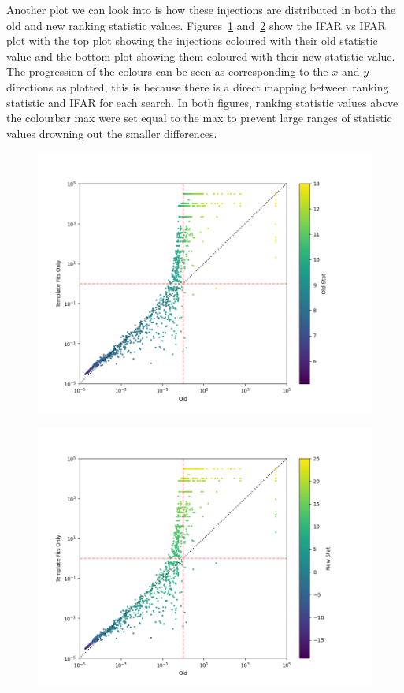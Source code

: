 %
Another plot we can look into is how these injections are distributed in both the old and new ranking statistic values. Figures~\ref{fig:pycbclive-ifar-ifar-old-stat} and~\ref{fig:pycbclive-ifar-ifar-new-stat} show the IFAR vs IFAR plot with the top plot showing the injections coloured with their old statistic value and the bottom plot showing them coloured with their new statistic value. The progression of the colours can be seen as corresponding to the $x$ and $y$ directions as plotted, this is because there is a direct mapping between ranking statistic and IFAR for each search. In both figures, ranking statistic values above the colourbar max were set equal to the max to prevent large ranges of statistic values drowning out the smaller differences.
%
\begin{figure}
    \centering
    \includegraphics[width=1\textwidth]{images/5_pycbclive/ifar_vs_ifar_old_stat.png}
    \caption{}
    \label{fig:pycbclive-ifar-ifar-old-stat}
\end{figure}
%
\begin{figure}
    \centering
    \includegraphics[width=1\textwidth]{images/5_pycbclive/ifar_vs_ifar_new_stat.png}
    \caption{}
    \label{fig:pycbclive-ifar-ifar-new-stat}
\end{figure}
%

